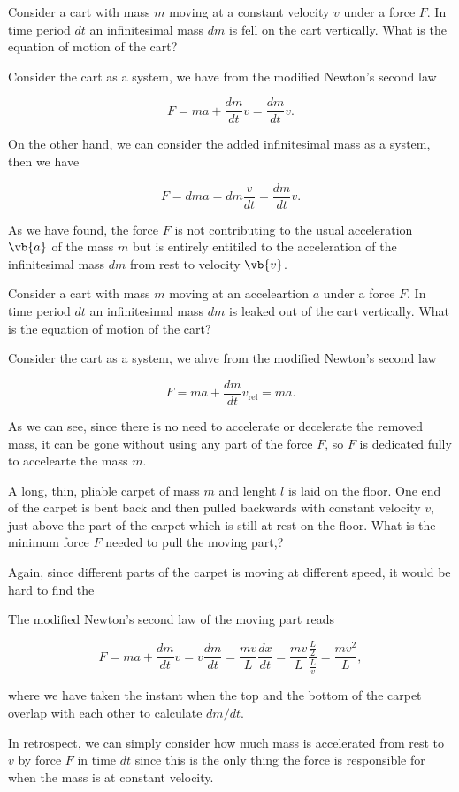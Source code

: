 \documentclass[a4paper,12pt]{report}
\begin{document}
{Consider a cart with mass \(m\) moving at a constant velocity \(v\) under a force \(F\). In time period \(dt\) an infinitesimal mass \(dm\) is fell on the cart vertically. What is the equation of motion of the cart?}
{Consider the cart as a system, we have from the modified Newton's second law 

\begin{equation}
	F = ma + \frac{dm}{dt} v = \frac{dm}{dt}v.  
\end{equation}

On the other hand, we can consider the added infinitesimal mass as a system, then we have 

\begin{equation}
	F = dm a = dm \frac{v}{dt} = \frac{dm}{dt}v.   
\end{equation}

As we have found, the force \(F\) is not contributing to the usual acceleration \(\vb{a} \) of the mass \(m\) but is entirely entitiled to the acceleration of the infinitesimal mass \(dm\) from rest to velocity \(\vb{v} \).  
} 

{Consider a cart with mass \(m\) moving at an acceleartion \(a\) under a force \(F\). In time period \(dt\) an infinitesimal mass \(dm\) is leaked out of the cart vertically. What is the equation of motion of the cart? }
{Consider the cart as a system, we ahve from the modified Newton's second law

\begin{equation}
	F = ma + \frac{dm}{dt} v_{\text{rel} } = ma. 
\end{equation}

As we can see, since there is no need to accelerate or decelerate the removed mass, it can be gone without using any part of the force \(F\), so \(F\) is dedicated fully to accelearte the mass \(m\). 
} 

{A long, thin, pliable carpet of mass \(m\) and lenght \(l\) is laid on the floor. One end of the carpet is bent back and then pulled backwards with constant velocity \(v\), just above the part of the carpet which is still at rest on the floor. What is the minimum force \(F\) needed to pull the moving part,?}
{Again, since different parts of the carpet is moving at different speed, it would be hard to find the 

The modified Newton's second law of the moving part reads

\begin{equation}
	F = ma + \frac{dm}{dt} v = v \frac{dm}{dt} = \frac{mv}{L} \frac{dx}{dt} = \frac{mv}{L} \frac{\frac{L}{2} }{\frac{L}{v} } = \frac{mv^2}{L},    
\end{equation}

where we have taken the instant when the top and the bottom of the carpet overlap with each other to calculate \(dm /dt\).

In retrospect, we can simply consider how much mass is accelerated from rest to \(v\) by force \(F\) in time \(dt\) since this is the only thing the force is responsible for when the mass is at constant velocity.

} 
\end{document}
